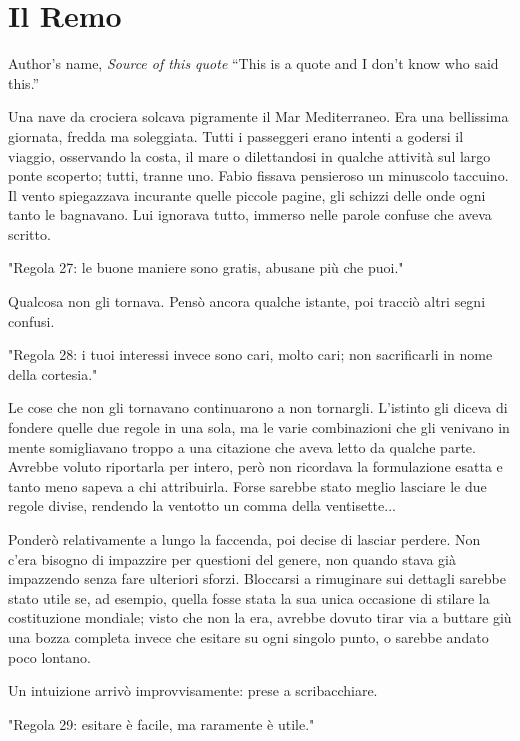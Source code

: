 \chapter{Il Remo}

\begin{chapquote}{Author's name, \textit{Source of this quote}}
``This is a quote and I don't know who said this.''
\end{chapquote}


Una nave da crociera solcava pigramente il Mar Mediterraneo. Era una bellissima giornata, fredda ma soleggiata. Tutti i passeggeri erano intenti a godersi il viaggio, osservando la costa, il mare o dilettandosi in qualche attività sul largo ponte scoperto; tutti, tranne uno. Fabio fissava pensieroso un minuscolo taccuino. Il vento spiegazzava incurante quelle piccole pagine, gli schizzi delle onde ogni tanto le bagnavano. Lui ignorava tutto, immerso nelle parole confuse che aveva scritto.

"Regola 27: le buone maniere sono gratis, abusane più che puoi."

Qualcosa non gli tornava. Pensò ancora qualche istante, poi tracciò altri segni confusi.

"Regola 28: i tuoi interessi invece sono cari, molto cari; non sacrificarli in nome della cortesia."

Le cose che non gli tornavano continuarono a non tornargli. L'istinto gli diceva di fondere quelle due regole in una sola, ma le varie combinazioni che gli venivano in mente somigliavano troppo a una citazione che aveva letto da qualche parte. Avrebbe voluto riportarla per intero, però non ricordava la formulazione esatta e tanto meno sapeva a chi attribuirla. Forse sarebbe stato meglio lasciare le due regole divise, rendendo la ventotto un comma della ventisette...

Ponderò relativamente a lungo la faccenda, poi decise di lasciar perdere. Non c'era bisogno di impazzire per questioni del genere, non quando stava già impazzendo senza fare ulteriori sforzi. Bloccarsi a rimuginare sui dettagli sarebbe stato utile se, ad esempio, quella fosse stata la sua unica occasione di stilare la costituzione mondiale; visto che non la era, avrebbe dovuto tirar via a buttare giù una bozza completa invece che esitare su ogni singolo punto, o sarebbe andato poco lontano. 

Un intuizione arrivò improvvisamente: prese a scribacchiare.

"Regola 29: esitare è facile, ma raramente è utile."

